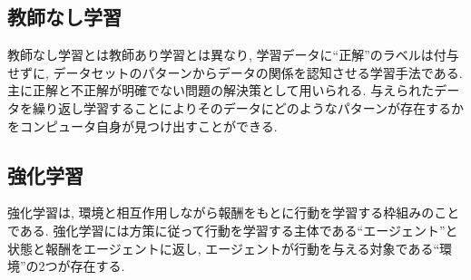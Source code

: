\subsection{教師なし学習}
教師なし学習とは教師あり学習とは異なり, 学習データに``正解''のラベルは付与せずに, データセットのパターンからデータの関係を認知させる学習手法である. 主に正解と不正解が明確でない問題の解決策として用いられる. 
与えられたデータを繰り返し学習することによりそのデータにどのようなパターンが存在するかをコンピュータ自身が見つけ出すことができる. 


\subsection{強化学習}
強化学習は, 環境と相互作用しながら報酬をもとに行動を学習する枠組みのことである. 強化学習には方策に従って行動を学習する主体である``エージェント''と状態と報酬をエージェントに返し, エージェントが行動を与える対象である``環境''の2つが存在する. 







